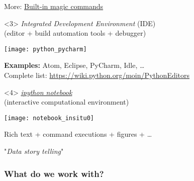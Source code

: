 \begin{frame}[fragile, c]
\begin{onlyenv}
More: \href{http://ipython.readthedocs.org/en/stable/interactive/magics.html?highlight=magic#built-in-magic-commands}{Built-in magic commands}
\end{onlyenv}


\begin{onlyenv}<3> 
\textit{Integrated Development Environment} (IDE)\\
(editor + build automation tools + debugger)

\vfill
\texttt{[image: python\_pycharm]}
\vfill

\textbf{Examples:} Atom, Eclipse, PyCharm, Idle, \ldots\\
Complete list: \url{https://wiki.python.org/moin/PythonEditors}
\end{onlyenv}

\begin{onlyenv}<4>
\href{http://ipython.org/notebook.html}{\textit{ipython notebook}}\\
(interactive computational environment)

\vfill
\texttt{[image: notebook\_insitu0]}
\vfill

Rich text + command executions + figures + \ldots

"\textit{Data story telling}"
\end{onlyenv}

\end{frame}

\begin{frame}[c]
\frametitle{What do we work with?}
\huge
\faLaptop

\vfill 

\end{frame}



